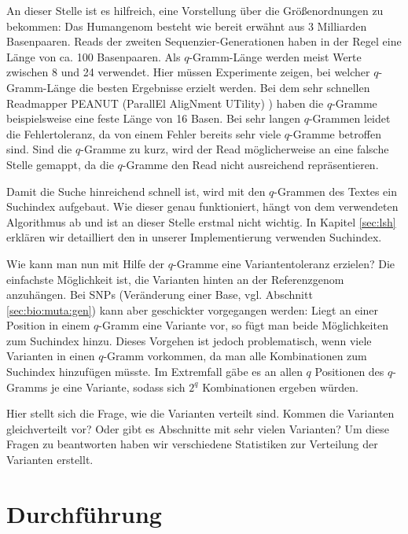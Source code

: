 An dieser Stelle ist es hilfreich, eine Vorstellung über die Größenordnungen zu bekommen: Das Humangenom besteht wie bereit erwähnt aus 3 Milliarden Basenpaaren. Reads der zweiten Sequenzier-Generationen haben in der Regel eine Länge von ca. 100 Basenpaaren. Als $q$-Gramm-Länge werden meist Werte zwischen 8 und 24 verwendet. Hier müssen Experimente zeigen, bei welcher $q$-Gramm-Länge die besten Ergebnisse erzielt werden. Bei dem sehr schnellen Readmapper PEANUT (ParallEl AligNment UTility)
) \citep{Koester2014} haben die $q$-Gramme beispielsweise eine feste Länge von 16 Basen. Bei sehr langen $q$-Grammen leidet die Fehlertoleranz, da von einem Fehler bereits sehr viele $q$-Gramme betroffen sind. Sind die $q$-Gramme zu kurz, wird der Read möglicherweise an eine falsche Stelle gemappt, da die $q$-Gramme den Read nicht ausreichend repräsentieren.

Damit die Suche hinreichend schnell ist, wird mit den $q$-Grammen des Textes ein Suchindex aufgebaut. Wie dieser genau funktioniert, hängt von dem verwendeten Algorithmus ab und ist an dieser Stelle erstmal nicht wichtig. In Kapitel \ref{sec:lsh} erklären wir detailliert den in unserer Implementierung verwenden Suchindex. 

Wie kann man nun mit Hilfe der $q$-Gramme eine Variantentoleranz erzielen? Die einfachste Möglichkeit ist, die Varianten hinten an der Referenzgenom anzuhängen. Bei SNPs (Veränderung einer Base, vgl. Abschnitt \ref{sec:bio:muta:gen}) kann aber geschickter vorgegangen werden: Liegt an einer Position in einem $q$-Gramm eine Variante vor, so fügt man beide Möglichkeiten zum Suchindex hinzu. Dieses Vorgehen ist jedoch problematisch, wenn viele Varianten in einen $q$-Gramm vorkommen, da man alle Kombinationen zum Suchindex hinzufügen müsste. Im Extremfall gäbe es an allen $q$ Positionen des $q$-Gramms je eine Variante, sodass sich $2^q$ Kombinationen ergeben würden.

Hier stellt sich die Frage, wie die Varianten verteilt sind. Kommen die Varianten gleichverteilt vor? Oder gibt es Abschnitte mit sehr vielen Varianten? Um diese Fragen zu beantworten haben wir verschiedene Statistiken zur Verteilung der Varianten erstellt.

\section{Durchführung}
\label{sec:stats:durchfuhrung}

